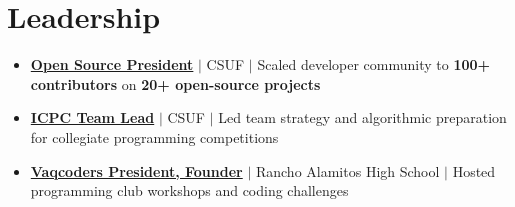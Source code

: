 \documentclass[letterpaper,11pt]{article}
\newcommand{\resumeItem}[1]{
  \item\small{
    {#1 \vspace{-2pt}}
  }
}
\newcommand{\resumeSubHeadingListStart}{\begin{itemize}[leftmargin=0.15in, label={}]}
\newcommand{\resumeSubHeadingListEnd}{\end{itemize}}
\begin{document}
\section{Leadership}
\resumeSubHeadingListStart
  \resumeItem{\textbf{\href{https://github.com/acmcsufoss}{Open Source President}} $|$ CSUF $|$ Scaled developer community to \textbf{100+ contributors} on \textbf{20+ open-source projects}}
  \resumeItem{\textbf{\href{https://acmcsuf.com/blog/322}{ICPC Team Lead}} $|$ CSUF $|$ Led team strategy and algorithmic preparation for collegiate programming competitions}
  \resumeItem{\textbf{\href{https://vaqcoders.github.io/}{Vaqcoders President, Founder}} $|$ Rancho Alamitos High School $|$ Hosted programming club workshops and coding challenges}
\resumeSubHeadingListEnd

\end{document}
